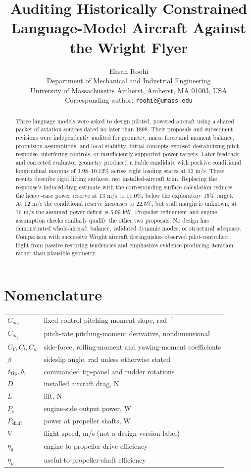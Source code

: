 \documentclass[10pt,letterpaper]{article}
\title{Auditing Historically Constrained Language-Model Aircraft Against the Wright Flyer}
\author{Ehsan Roohi\\
\small Department of Mechanical and Industrial Engineering\\
\small University of Massachusetts Amherst, Amherst, MA 01003, USA\\
\small Corresponding author: \texttt{roohie@umass.edu}}
\date{}
\begin{document}
\maketitle

\begin{abstract}
Three language models were asked to design piloted, powered aircraft using a shared packet of aviation sources dated no later than 1898. Their proposals and subsequent revisions were independently audited for geometry, mass, force and moment balance, propulsion assumptions, and local stability. Initial concepts exposed destabilizing pitch response, interfering controls, or insufficiently supported power targets. Later feedback and corrected evaluator geometry produced a Fable candidate with positive conditional longitudinal margins of 3.98--10.12\% across eight loading states at 13 m/s. These results describe rigid lifting surfaces, not installed-aircraft trim. Replacing the response's induced-drag estimate with the corresponding surface calculation reduces the heavy-case power reserve at 13 m/s to 11.0\%, below the exploratory 15\% target. At 12 m/s the conditional reserve increases to 22.5\%, but stall margin is unknown; at 16 m/s the assumed power deficit is 5.99 kW. Propeller refinement and engine-assumption checks similarly qualify the other two proposals. No design has demonstrated whole-aircraft balance, validated dynamic modes, or structural adequacy. Comparison with successive Wright aircraft distinguishes observed pilot-controlled flight from passive restoring tendencies and emphasizes evidence-producing iteration rather than plausible geometry.
\end{abstract}

\section*{Nomenclature}
\noindent\begin{tabular}{@{}ll@{}}
$C_{m_\alpha}$ & fixed-control pitching-moment slope, rad$^{-1}$\\
$C_{m_q}$ & pitch-rate pitching-moment derivative, nondimensional\\
$C_Y,C_l,C_n$ & side-force, rolling-moment and yawing-moment coefficients\\
$\beta$ & sideslip angle, rad unless otherwise stated\\
$\delta_{\rm tip},\delta_r$ & commanded tip-panel and rudder rotations\\
$D$ & installed aircraft drag, N\\
$L$ & lift, N\\
$P_e$ & engine-side output power, W\\
$P_{\mathrm{shaft}}$ & power at propeller shafts, W\\
$V$ & flight speed, m/s (not a design-version label)\\
$\eta_g$ & engine-to-propeller drive efficiency\\
$\eta_p$ & useful-to-propeller-shaft efficiency\\
\end{tabular}
\end{document}
